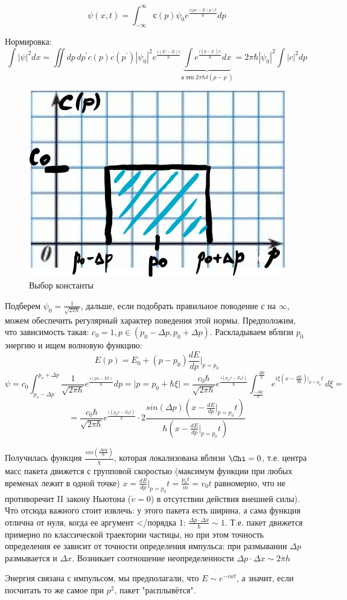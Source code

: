$$ \psi (x, t) = \int_{- \infty}^{\infty} с(p)  \psi _0 e^{\frac{i(px-E(p)t}{\hbar}} dp $$
\par Нормировка: $$\int | \psi |^2 dx = \iint dp \, dp^\prime c(p)c(p^\prime) | \psi _0 |^2 e^{\frac{i(E\prime-E)t}{\hbar}}  \underbrace{\int e^{\frac{i(p-p^\prime)x}{\hbar}} dx}_{\text{а это } 2 \pi \hbar \delta (p-p^\prime)}=  2 \pi \hbar  | \psi _0 |^2 \int |c|^2 dp $$
\par 
\begin{figure} 
\vspace{-2ex}
\centering
\includegraphics[width=0.8\linewidth]{pictures/4.1.jpg}
\caption{Выбор константы}
\end{figure}
\par Подберем
$ \psi _0 =\frac{1}{\sqrt{2 \pi \hbar}} $, дальше, если подобрать правильное поводение \textit{с} на $\infty$, можем обеспечить регулярный характер поведения этой нормы. Предположим, что зависимость такая: $c_0 = 1, p \in (p_0- \Delta p, p_0 + \Delta p ) $. Раскладываем вблизи $p_0$ энергию и ищем волновую функцию:
$$ E(p)= E_0 + (p-p_0) \frac{dE}{dp} \bigg|_{p=p_0} $$
$$ \psi = c_0 \int_{p_o - \Delta p}^{p_o + \Delta p} \frac{1}{\sqrt{2 \pi \hbar}} e^{\frac{i(px-Et)}{\hbar}} dp =\bigg| p=p_0+ \hbar \xi \bigg| =\frac{c_0 \hbar}{\sqrt{2 \pi \hbar}} e^{\frac{i(p_0x-E_0t)}{\hbar}} \int_{\frac{ - \Delta p}{\hbar}}^{\frac{ \Delta p}{\hbar}} \,e^{i \xi (x- \frac{dE}{dp})|_{p=p_0} t } \, d \xi =$$
$$=\frac{c_0 \hbar}{\sqrt{2 \pi \hbar}} e^{\frac{i(p_0x-E_0t)}{\hbar}} \cdot 2 \frac{sin(\Delta p) (x- \frac{dE}{dp}|_{p=p_0} t )}{\hbar (x- \frac{dE}{dp}|_{p=p_0} t )} $$
\par Получилась функция $\frac{sin(\frac{\Delta p \chi}{\hbar})}{\chi}$, которая локализована вблизи $\Chi = 0$, т.е. центра масс пакета движется с групповой скоростью (максимум функции при любых временах лежит в одной точке) $x=\frac{dE}{dp}|_{p=p_0} t = \frac{p_0 t}{m} = v_0 t $ равномерно, что не противоречит II закону Ньютона ($ \dot{v} =0$) в отсутствии действия внешней силы). Что отсюда важного стоит извлечь: у этого пакета есть ширина, а сама функция отлична от нуля, когда ее аргумент </порядка 1: $ \frac{\Delta p \cdot \Delta x}{\hbar} \sim 1 $. Т.е. пакет движется примерно по классической траектории частицы, но при этом точность определения ее зависит от точности определения импульса: при размывании $\Delta p$ размывается и $\Delta x$. Возникает соотношение неопределенности $ \Delta p \cdot \Delta x \sim 2 \pi h $
\par Энергия связана с импульсом, мы предполагали, что $E \sim e^{-iwt} $, а значит, если посчитать то же самое при $p^2 $, пакет "расплывётся".
 